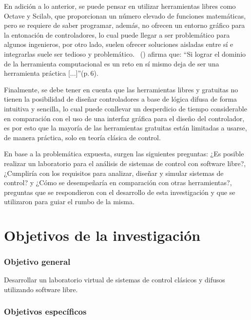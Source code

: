 	En adición a lo anterior, se puede pensar en utilizar herramientas libres como Octave y Scilab, que proporcionan un número elevado de funciones matemáticas, pero se requiere de saber programar, además, no ofrecen un entorno gráfico para la entonación de controladores, lo cual puede llegar a ser problemático para algunos ingenieros, por otro lado, suelen ofrecer soluciones aisladas entre sí e integrarlas suele ser tedioso y problemático. \citeauthor{Suarez}~(\citeyear{Suarez}) afirma que: \enquote{Si lograr el dominio de la herramienta computacional es un reto en sí mismo deja de ser una herramienta práctica [...]}(p.$\,$6).
	
	Finalmente, se debe tener en cuenta que las herramientas libres y gratuitas no tienen la posibilidad de diseñar controladores a base de lógica difusa de forma intuitiva y sencilla, lo cual puede conllevar un desperdicio de tiempo considerable en comparación con el uso de una interfaz gráfica para el diseño del controlador, es por esto que la mayoría de las herramientas gratuitas están limitadas a usarse, de manera práctica, solo en teoría clásica de control. 
	
	En base a la problemática expuesta, surgen las siguientes preguntas: ¿Es posible realizar un laboratorio para el análisis de sistemas de control con software libre?, ¿Cumpliría con los requisitos para analizar, diseñar y simular sistemas de control? y ¿Cómo se desempeñaría en comparación con otras herramientas?, preguntas que se respondieron con el desarrollo de esta investigación y que se utilizaron para guiar el rumbo de la misma.
	
\section{Objetivos de la investigación}
	
	\subsubsection{Objetivo general}
		
		Desarrollar un laboratorio virtual de sistemas de control clásicos y difusos utilizando software libre.
		
	\subsubsection{Objetivos específicos}
		
